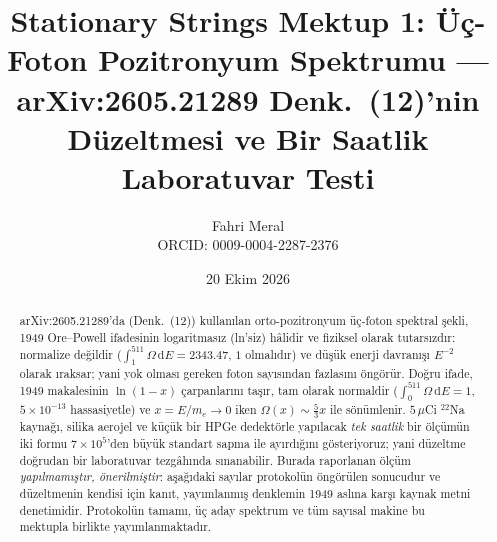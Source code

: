 \documentclass[11pt,a4paper]{article}
\title{\textbf{Stationary Strings Mektup 1: Üç-Foton Pozitronyum Spektrumu --- arXiv:2605.21289 Denk.~(12)'nin Düzeltmesi ve Bir Saatlik Laboratuvar Testi}}
\author{Fahri Meral\\[0.2em]\small ORCID: 0009-0004-2287-2376}
\date{20 Ekim 2026}
\begin{document}
\shorthandoff{=}

\maketitle

\begin{abstract}
arXiv:2605.21289'da (Denk.~(12)) kullanılan orto-pozitronyum üç-foton
spektral şekli, 1949 Ore--Powell ifadesinin logaritmasız (ln'siz) hâlidir
ve fiziksel olarak tutarsızdır: normalize değildir
($\int_1^{511}\Omega\,\mathrm{d}E = 2343.47$, $1$ olmalıdır) ve düşük
enerji davranışı $E^{-2}$ olarak ıraksar; yani yok olması gereken
foton sayısından fazlasını öngörür. Doğru ifade, 1949 makalesinin
$\ln(1-x)$ çarpanlarını taşır, tam olarak normaldir
($\int_0^{511}\Omega\,\mathrm{d}E = 1$, $5\times10^{-13}$ hassasiyetle)
ve $x = E/m_e \to 0$ iken $\Omega(x)\sim\tfrac{5}{3}x$ ile sönümlenir.
$5\,\mu$Ci $^{22}$Na kaynağı, silika aerojel ve küçük bir HPGe dedektörle
yapılacak \emph{tek saatlik} bir ölçümün iki formu $7\times10^{5}$'den
büyük standart sapma ile ayırdığını gösteriyoruz; yani düzeltme doğrudan
bir laboratuvar tezgâhında sınanabilir. Burada raporlanan ölçüm
\emph{yapılmamıştır, önerilmiştir}: aşağıdaki sayılar protokolün öngörülen
sonucudur ve düzeltmenin kendisi için kanıt, yayımlanmış denklemin 1949
aslına karşı kaynak metni denetimidir. Protokolün tamamı, üç aday
spektrum ve tüm sayısal makine bu mektupla birlikte yayımlanmaktadır.
\end{abstract}
\end{document}
